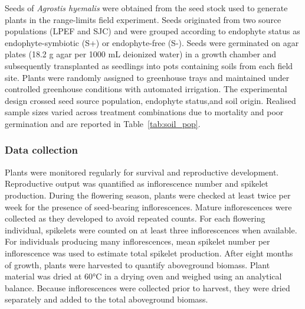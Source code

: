 \documentclass[12pt]{article}\usepackage[]{graphicx}\usepackage[dvipsnames]{xcolor}
\begin{document}
{Seeds of \textit{Agrostis hyemalis} were obtained from the seed stock used to generate plants in the range-limits field experiment. 
Seeds originated from two source populations (LPEF and SJC) and were grouped according to endophyte status as endophyte-symbiotic (S+) or endophyte-free (S-).
Seeds were germinated on agar plates (18.2 g agar per 1000 mL deionized water) in a growth chamber and subsequently transplanted as seedlings
into pots containing soils from each field site. 
Plants were randomly assigned to greenhouse trays and maintained under controlled greenhouse conditions with automated irrigation.
The experimental design crossed seed source population, endophyte status,and soil origin. 
Realised sample sizes varied across treatment combinations due to mortality and poor germination and are reported in Table~\ref{tab:soil_pop}.

\subsubsection*{Data collection}

Plants were monitored regularly for survival and reproductive development. 
Reproductive output was quantified as inflorescence number and spikelet production. 
During the flowering season, plants were checked at least twice per week for the presence of seed-bearing inflorescences. 
Mature inflorescences were collected as they developed to avoid repeated counts. 
For each flowering individual, spikelets were counted on at least three inflorescences when available.
For individuals producing many inflorescences, mean spikelet number per inflorescence was used to estimate total spikelet production.
After eight months of growth, plants were harvested to quantify aboveground biomass. 
Plant material was dried at 60°C in a drying oven and weighed using an analytical balance. 
Because inflorescences were collected prior to harvest, they were dried separately and added to the total aboveground biomass.

}
\end{document}
